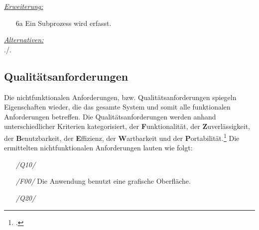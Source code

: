 \underline{\emph{Erweiterung:}}
\begin{itemize}
    \item [6a] Ein Subprozess wird erfasst.
\end{itemize}
\underline{\emph{Alternativen:}} \\
./.\\



\subsection{Qualitätsanforderungen}
Die nichtfunktionalen Anforderungen, bzw. Qualitätsanforderungen spiegeln Eigenschaften wieder, die das gesamte System und somit alle funktionalen Anforderungen betreffen. Die Qualitätsanforderungen werden anhand unterschiedlicher Kriterien kategorisiert, der \textbf{F}unktionalität, der \textbf{Z}uverlässigkeit, der \textbf{B}enutzbarkeit, der \textbf{E}ffizienz, der \textbf{W}artbarkeit und der \textbf{P}ortabilität.\footcite[Vgl.][S. 494 f.]{balzert} Die ermittelten nichtfunktionalen Anforderungen lauten wie folgt:
\begin{itemize}
    \item[] \emph{/Q10/}
    \item[] \emph{/F00/} Die Anwendung benutzt eine grafische Oberfläche.
    \vspace{0.5cm}
    \item[] \emph{/Q20/}
\end{itemize}


